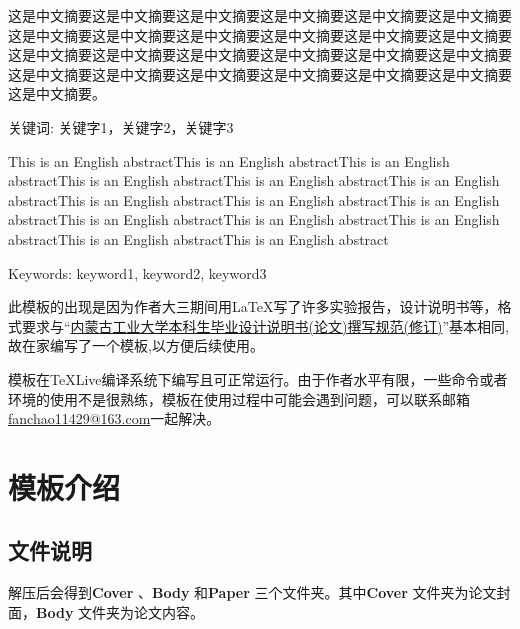 \documentclass{imutthesis}
\begin{document}
\begin{cnabstract}
这是中文摘要这是中文摘要这是中文摘要这是中文摘要这是中文摘要这是中文摘要这是中文摘要这是中文摘要这是中文摘要这是中文摘要这是中文摘要这是中文摘要这是中文摘要这是中文摘要这是中文摘要这是中文摘要这是中文摘要这是中文摘要这是中文摘要这是中文摘要这是中文摘要这是中文摘要这是中文摘要这是中文摘要这是中文摘要。

\par 关键词: 关键字1，关键字2，关键字3    %

\end{cnabstract}

\begin{enabstract}
    This is an English abstractThis is an English abstractThis is an English abstractThis is an English abstractThis is an English abstractThis is an English abstractThis is an English abstractThis is an English abstractThis is an English abstractThis is an English abstractThis is an English abstractThis is an English abstractThis is an English abstractThis is an English abstract

	\par Keywords: keyword1, keyword2, keyword3   %

\end{enabstract}

\tableofcontents    %
\listoffigures    %
\listoftables     %
\newpage 
{}
\setcounter{page}{1}
\begin{introduction}
	
 此模板的出现是因为作者大三期间用\LaTeX 写了许多实验报告，设计说明书等，\reversemarginpar{}格式要求与“\href{http://jwch.imut.edu.cn/jwzx/infoSingleArticle.do?articleId=10889&columnId=}{内蒙古工业大学本科生毕业设计说明书(论文)撰写规范(修订)}”基本相同,故在家编写了一个模板,以方便后续使用。

模板在\TeX Live编译系统下编写且可正常运行。由于作者水平有限，一些命令或者环境的使用不是很熟练，模板在使用过程中可能会遇到问题，可以联系邮箱\url{fanchao11429@163.com}一起解决。

\end{introduction}

\section{模板介绍}
\subsection{文件说明}
解压后会得到\textbf{Cover} 、\textbf{Body} 和\textbf{Paper} 三个文件夹。其中\textbf{Cover} 文件夹为论文封面，\textbf{Body} 文件夹为论文内容。 
\end{document}
